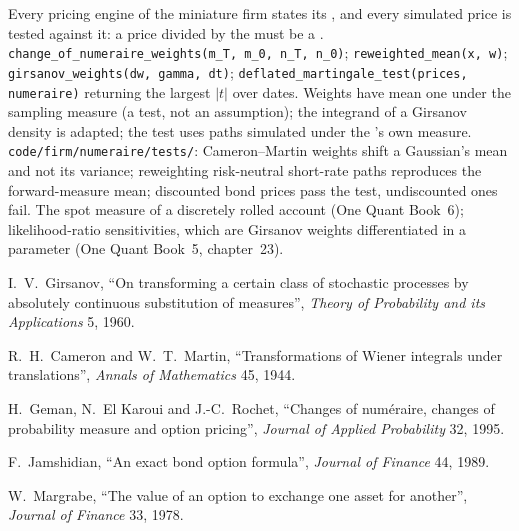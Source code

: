 \begin{build}
 Every pricing engine of the miniature firm states its , and every
simulated price is tested against it: a price divided by the  must be a .
 \texttt{change\_of\_numeraire\_weights(m\_T, m\_0, n\_T, n\_0)};
\texttt{reweighted\_mean(x, w)}; \texttt{girsanov\_weights(dw, gamma, dt)};
\texttt{deflated\_martingale\_test(prices, numeraire)} returning the largest $|t|$ over dates.
 Weights have mean one under the sampling measure (a test, not an assumption); the
integrand of a Girsanov density is adapted; the  test uses paths simulated under the
's own measure.
 \texttt{code/firm/numeraire/tests/}: Cameron--Martin weights shift a
Gaussian's mean and not its variance; reweighting risk-neutral short-rate paths reproduces the
forward-measure mean; discounted bond prices pass the  test, undiscounted ones fail.
 The spot measure of a discretely rolled account (One Quant Book~6); likelihood-ratio
sensitivities, which are Girsanov weights differentiated in a parameter (One Quant Book~5,
chapter~23).
\end{build}

\begin{omsources}
\item I.~V.~Girsanov, ``On transforming a certain class of stochastic processes by absolutely
continuous substitution of measures'', \emph{Theory of Probability and its Applications} 5, 1960.
\item R.~H.~Cameron and W.~T.~Martin, ``Transformations of Wiener integrals under translations'',
\emph{Annals of Mathematics} 45, 1944.
\item H.~Geman, N.~El Karoui and J.-C.~Rochet, ``Changes of numéraire, changes of probability
measure and option pricing'', \emph{Journal of Applied Probability} 32, 1995.
\item F.~Jamshidian, ``An exact bond option formula'', \emph{Journal of Finance} 44, 1989.
\item W.~Margrabe, ``The value of an option to exchange one asset for another'', \emph{Journal of
Finance} 33, 1978.
\end{omsources}

